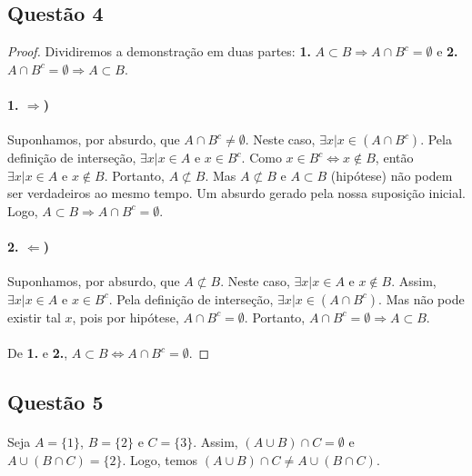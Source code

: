 \documentclass[11pt,a4paper]{report}
\begin{document}
    \subsection{Questão 4}
    \begin{proof}
    Dividiremos a demonstração em duas partes: \textbf{1.} $A \subset B \Rightarrow A \cap B^c = \emptyset$ e \textbf{2.} $A \cap B^c = \emptyset \Rightarrow A \subset B$.

    \paragraph{1. $\Rightarrow$)}
    Suponhamos, por absurdo, que $A \cap B^c \not= \emptyset$. Neste caso, $\exists x | x \in (A \cap B^c)$. Pela definição de interseção, $\exists x | x \in A $ e $x \in B^c$. Como $x \in B^c \Leftrightarrow x \not\in B$, então $\exists x | x \in A $ e $x \not\in B$. Portanto, $A \not\subset B$. Mas $A \not\subset B$ e $A \subset B$ (hipótese) não podem ser verdadeiros ao mesmo tempo. Um absurdo gerado pela nossa suposição inicial. Logo, $A \subset B \Rightarrow A \cap B^c = \emptyset$.

    \paragraph{2. $\Leftarrow$)}
    Suponhamos, por absurdo, que $A \not\subset B$. Neste caso, $\exists x | x \in A $ e $x \not\in B$. Assim, $\exists x | x \in A$ e $x \in B^c$. Pela definição de interseção, $\exists x | x \in (A \cap B^c)$. Mas não pode existir tal $x$, pois por hipótese, $A \cap B^c = \emptyset$. Portanto, $A \cap B^c = \emptyset \Rightarrow A \subset B$.
    
    \paragraph{}
    De \textbf{1.} e \textbf{2.}, $A \subset B \Leftrightarrow A \cap B^c = \emptyset$.
    \end{proof}


    \subsection{Questão 5}
    \paragraph{}
    Seja $A = \{1\}$, $B = \{2\}$ e $C = \{3\}$. Assim, $(A \cup B) \cap C = \emptyset$ e $A \cup(B \cap C) = \{2\}$. Logo, temos $(A \cup B) \cap C \not= A \cup (B \cap C)$.


        
\end{document}
